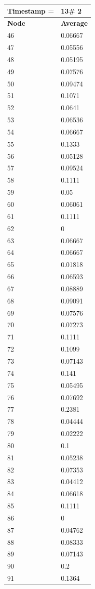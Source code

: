 \begin{tabular}{|l||l|}
\hline
\textbf{Timestamp =} & \textbf{13}\# 2\\\hline
	\textbf{Node} & \textbf{Average} \\ \hline
\hline
	46 & 0.06667 \\ \hline
	47 & 0.05556 \\ \hline
	48 & 0.05195 \\ \hline
	49 & 0.07576 \\ \hline
	50 & 0.09474 \\ \hline
	51 & 0.1071 \\ \hline
	52 & 0.0641 \\ \hline
	53 & 0.06536 \\ \hline
	54 & 0.06667 \\ \hline
	55 & 0.1333 \\ \hline
	56 & 0.05128 \\ \hline
	57 & 0.09524 \\ \hline
	58 & 0.1111 \\ \hline
	59 & 0.05 \\ \hline
	60 & 0.06061 \\ \hline
	61 & 0.1111 \\ \hline
	62 & 0 \\ \hline
	63 & 0.06667 \\ \hline
	64 & 0.06667 \\ \hline
	65 & 0.01818 \\ \hline
	66 & 0.06593 \\ \hline
	67 & 0.08889 \\ \hline
	68 & 0.09091 \\ \hline
	69 & 0.07576 \\ \hline
	70 & 0.07273 \\ \hline
	71 & 0.1111 \\ \hline
	72 & 0.1099 \\ \hline
	73 & 0.07143 \\ \hline
	74 & 0.141 \\ \hline
	75 & 0.05495 \\ \hline
	76 & 0.07692 \\ \hline
	77 & 0.2381 \\ \hline
	78 & 0.04444 \\ \hline
	79 & 0.02222 \\ \hline
	80 & 0.1 \\ \hline
	81 & 0.05238 \\ \hline
	82 & 0.07353 \\ \hline
	83 & 0.04412 \\ \hline
	84 & 0.06618 \\ \hline
	85 & 0.1111 \\ \hline
	86 & 0 \\ \hline
	87 & 0.04762 \\ \hline
	88 & 0.08333 \\ \hline
	89 & 0.07143 \\ \hline
	90 & 0.2 \\ \hline
	91 & 0.1364 \\ \hline
\end{tabular}
